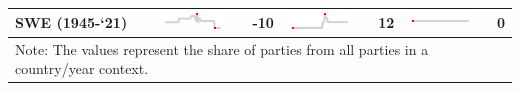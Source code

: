 \begin{table}[H]
\begin{tabular}[t]{l>{}lr>{}lr>{}lr}
SWE (1945-`21) & \includegraphics[width=0.67in, height=0.17in]{./figures/spec_plot/plot_14f3c3b28e6.pdf} & -10 & \includegraphics[width=0.67in, height=0.17in]{./figures/spec_plot/plot_14f3c8a9fd48.pdf} & 12 & \includegraphics[width=0.67in, height=0.17in]{./figures/spec_plot/plot_14f3c793a2f3a.pdf} & 0\\
\bottomrule
\multicolumn{7}{l}{\rule{0pt}{1em}Note: The values represent the share of parties from all parties in a country/year context.}\\
\end{tabular}
\end{table}
